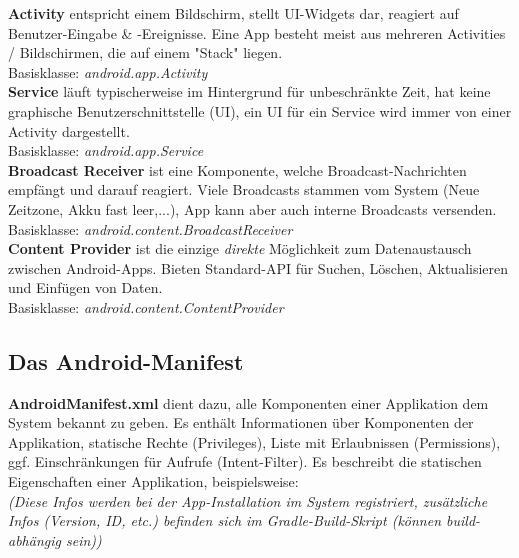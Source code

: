 \documentclass[a4paper]{article}
\begin{document}
\noindent
\textbf{Activity} entspricht einem Bildschirm, stellt UI-Widgets dar, reagiert auf Benutzer-Eingabe \& -Ereignisse. Eine App besteht meist aus mehreren Activities / Bildschirmen, die auf einem "Stack" liegen. \\
Basisklasse: \textit{android.app.Activity} \\
\textbf{Service} läuft typischerweise im Hintergrund für unbeschränkte Zeit, hat keine graphische Benutzer\-schnittstelle (UI), ein UI für ein Service wird immer von einer Activity dargestellt. \\
Basisklasse: \textit{android.app.Service} \\
\textbf{Broadcast Receiver} ist eine Komponente, welche Broadcast-Nachrichten empfängt und darauf reagiert. Viele Broadcasts stammen vom System (Neue Zeitzone, Akku fast leer,...), App kann aber auch interne Broadcasts versenden. \\
Basisklasse: \textit{android.content.BroadcastReceiver}\\
\textbf{Content Provider} ist die einzige \textit{direkte} Möglichkeit zum Datenaustausch zwischen Android-Apps. Bieten Standard-API für Suchen, Löschen, Aktualisieren und Einfügen von Daten. \\
Basisklasse: \textit{android.content.ContentProvider}
\newpage
\subsection{Das Android-Manifest}
\textbf{AndroidManifest.xml} dient dazu, alle Komponenten einer Applikation dem System bekannt zu geben. Es enthält Informationen über Komponenten der Applikation, statische Rechte (Privileges), Liste mit Erlaubnissen (Permissions), ggf. Einschränkungen für Aufrufe (Intent-Filter). Es beschreibt die statischen Eigenschaften einer Applikation, beispielsweise: \\
\textit{(Diese Infos werden bei der App-Installation im System registriert, zusätzliche Infos (Version, ID, etc.) befinden sich im Gradle-Build-Skript (können build-abhängig sein))}
\end{document}
